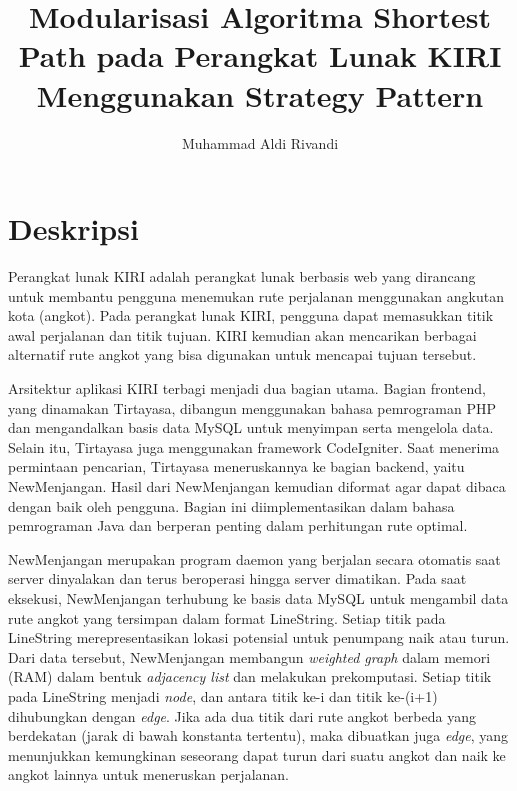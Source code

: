 \documentclass[a4paper,twoside]{article}
\begin{document}
	
	\title{Modularisasi Algoritma Shortest Path pada Perangkat Lunak KIRI Menggunakan Strategy Pattern}
        \author{Muhammad Aldi Rivandi } 
	
	\newcommand{\nama}{Muhammad Aldi Rivandi}
	\newcommand{\@npm}{6182001029}
	\newcommand{\@judultopik}{Modularisasi Algoritma Shortest Path pada Perangkat Lunak KIRI Menggunakan Strategy Pattern} %
	\newcommand{\jumpemb}{1} %
	\newcommand{\tanggal}{01/01/1900}
	
	
	\maketitle
	
	
	\section{Deskripsi}
	Perangkat lunak KIRI adalah perangkat lunak berbasis web yang dirancang untuk membantu pengguna menemukan rute perjalanan menggunakan angkutan kota (angkot). Pada perangkat lunak KIRI, pengguna dapat memasukkan titik awal perjalanan dan titik tujuan. KIRI kemudian akan mencarikan berbagai alternatif rute angkot yang bisa digunakan untuk mencapai tujuan tersebut.
	
	Arsitektur aplikasi KIRI terbagi menjadi dua bagian utama. Bagian frontend, yang dinamakan Tirtayasa, dibangun menggunakan bahasa pemrograman PHP dan mengandalkan basis data MySQL untuk menyimpan serta mengelola data. Selain itu, Tirtayasa juga menggunakan framework CodeIgniter. Saat menerima permintaan pencarian, Tirtayasa meneruskannya ke bagian backend, yaitu NewMenjangan. Hasil dari NewMenjangan kemudian diformat agar dapat dibaca dengan baik oleh pengguna. Bagian ini diimplementasikan dalam bahasa pemrograman Java dan berperan penting dalam perhitungan rute optimal.

 	NewMenjangan merupakan program daemon yang berjalan secara otomatis saat server dinyalakan dan terus beroperasi hingga server dimatikan. Pada saat eksekusi, NewMenjangan terhubung ke basis data MySQL untuk mengambil data rute angkot yang tersimpan dalam format LineString. Setiap titik pada LineString merepresentasikan lokasi potensial untuk penumpang naik atau turun. Dari data tersebut, NewMenjangan membangun \textit{weighted graph} dalam memori (RAM) dalam bentuk \textit{adjacency list} dan melakukan prekomputasi. Setiap titik pada LineString menjadi \textit{node}, dan antara titik ke-i dan titik ke-(i+1) dihubungkan dengan \textit{edge}. Jika ada dua titik dari rute angkot berbeda yang berdekatan (jarak di bawah konstanta tertentu), maka dibuatkan juga \textit{edge}, yang menunjukkan kemungkinan seseorang dapat turun dari suatu angkot dan naik ke angkot lainnya untuk meneruskan perjalanan. 
  
\end{document}
